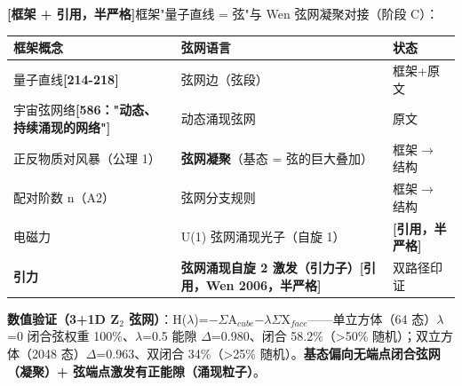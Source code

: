 \documentclass[UTF8,fontset=windows]{csoarticle}
\newcommand{\mtag}[1]{\textbf{[#1]}}
\newcommand{\down}[1]{\ensuremath{_{#1}}}
\begin{document}
\mtag{框架 + 引用，半严格}框架"量子直线 = 弦"与 Wen 弦网凝聚对接（阶段 C）：

\begin{table}[htbp]
\centering
\small
\begin{tabularx}{\textwidth}{@{}lXX@{}}
\toprule
框架概念 & 弦网语言 & 状态 \\
\midrule
量子直线\mtag{214-218} & 弦网边（弦段） & 框架+原文 \\
宇宙弦网络\mtag{586："动态、持续涌现的网络"} & 动态涌现弦网 & 原文 \\
正反物质对风暴（公理 1） & \textbf{弦网凝聚}（基态 = 弦的巨大叠加） & 框架\ensuremath{\to}结构 \\
配对阶数 n（A2） & 弦网分支规则 & 框架\ensuremath{\to}结构 \\
电磁力 & U(1) 弦网涌现光子（自旋 1） & \mtag{引用，半严格} \\
\textbf{引力} & \textbf{弦网涌现自旋 2 激发（引力子）}\mtag{引用，Wen 2006，半严格} & 双路径印证 \\
\bottomrule
\end{tabularx}
\end{table}

\textbf{数值验证（3+1D Z\down{2} 弦网）}：H(\ensuremath{\lambda})=\ensuremath{-}\ensuremath{\Sigma}A\down{cube}\ensuremath{-}\ensuremath{\lambda}\ensuremath{\Sigma}X\down{face}------单立方体（64 态）\ensuremath{\lambda}=0 闭合弦权重 100\%、\ensuremath{\lambda}=0.5 能隙 \ensuremath{\Delta}=0.980、闭合 58.2\%（>50\% 随机）；双立方体（2048 态）\ensuremath{\Delta}=0.963、双闭合 34\%（>25\% 随机）。\textbf{基态偏向无端点闭合弦网（凝聚）+ 弦端点激发有正能隙（涌现粒子）}。
\end{document}
